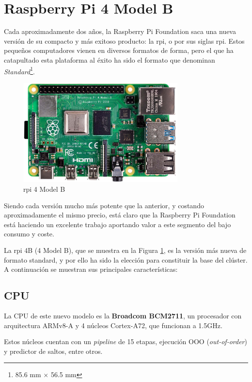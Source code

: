 \section{Raspberry Pi 4 Model B}
\label{sec:raspberry_pi_4_model_b}
Cada aproximadamente dos años, la Raspberry Pi Foundation saca una nueva versión de su compacto y más exitoso producto: la \acrlong{rpi}, o por sus siglas \acrshort{rpi}. Estos pequeños computadores vienen en diversos formatos de forma, pero el que ha catapultado esta plataforma al éxito ha sido el formato que denominan \textit{Standard}\footnote{85.6 mm × 56.5 mm}.

\begin{figure}[h!]
  \centering
  \includegraphics[width=0.75\textwidth]{img/rpi_parts/rpi_base.jpg}
  \caption{\acrlong{rpi} 4 Model B}
  \label{fig:rpi_base}
\end{figure}

Siendo cada versión mucho más potente que la anterior, y costando aproximadamente el mismo precio, está claro que la Raspberry Pi Foundation está haciendo un excelente trabajo aportando valor a este segmento del bajo consumo y coste.

La \acrlong{rpi} 4B (4 Model B), que se muestra en la Figura \ref{fig:rpi_base}, es la versión más nueva de formato standard, y por ello ha sido la elección para constituir la base del clúster. A continuación se muestran sus principales características: \cite{rpi4b_specifications}

\subsection{CPU}
La CPU de este nuevo modelo es la \textbf{Broadcom BCM2711}, un procesador con arquitectura ARMv8-A y 4 núcleos Cortex-A72, que funcionan a 1.5GHz.

Estos núcleos cuentan con un \textit{pipeline} de 15 etapas, ejecución OOO (\textit{out-of-order}) y predictor de saltos, entre otros.

